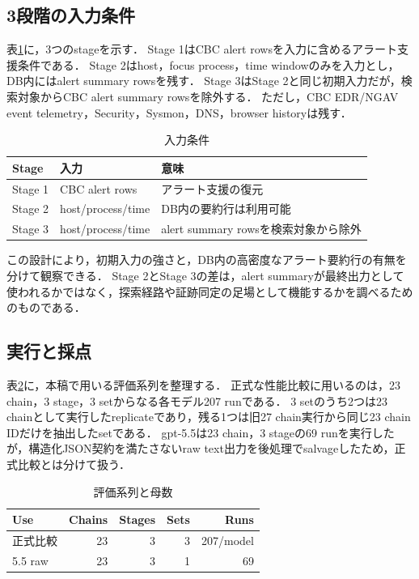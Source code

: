 \documentclass[dvipdfmx]{FITpaper}
\newcommand{\model}[1]{\mbox{\textrm{#1}}}
\begin{document}
\subsection{3段階の入力条件}

表\ref{table:stages}に，3つのstageを示す．
Stage 1はCBC alert rowsを入力に含めるアラート支援条件である．
Stage 2はhost，focus process，time windowのみを入力とし，DB内にはalert summary rowsを残す．
Stage 3はStage 2と同じ初期入力だが，検索対象からCBC alert summary rowsを除外する．
ただし，CBC EDR/NGAV event telemetry，Security，Sysmon，DNS，browser historyは残す．

\begin{table}[ht]
    \centering
    \caption{入力条件}
    \label{table:stages}
    \begin{tabularx}{\linewidth}{lXX}
        \toprule
        Stage & 入力 & 意味 \\
        \midrule
        Stage 1 & CBC alert rows & アラート支援の復元 \\
        Stage 2 & host/process/time & DB内の要約行は利用可能 \\
        Stage 3 & host/process/time & alert summary rowsを検索対象から除外 \\
        \bottomrule
    \end{tabularx}
\end{table}

この設計により，初期入力の強さと，DB内の高密度なアラート要約行の有無を分けて観察できる．
Stage 2とStage 3の差は，alert summaryが最終出力として使われるかではなく，探索経路や証跡同定の足場として機能するかを調べるためのものである．

\subsection{実行と採点}

表\ref{table:scope}に，本稿で用いる評価系列を整理する．
正式な性能比較に用いるのは，23 chain，3 stage，3 setからなる各モデル207 runである．
3 setのうち2つは23 chainとして実行したreplicateであり，残る1つは旧27 chain実行から同じ23 chain IDだけを抽出したsetである．
\model{gpt-5.5}は23 chain，3 stageの69 runを実行したが，構造化JSON契約を満たさないraw text出力を後処理でsalvageしたため，正式比較とは分けて扱う．

\begin{table}[ht]
    \centering
    \caption{評価系列と母数}
    \label{table:scope}
    \begin{tabular}{lrrrr}
        \toprule
        Use & Chains & Stages & Sets & Runs \\
        \midrule
        正式比較 & 23 & 3 & 3 & 207/model \\
        \model{5.5} raw & 23 & 3 & 1 & 69 \\
        \bottomrule
    \end{tabular}
\end{table}
\end{document}
